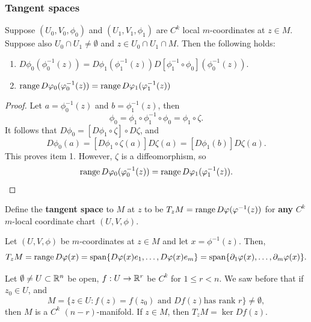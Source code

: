 \documentclass[a4paper]{article}
\begin{document}
\subsubsection{Tangent spaces}

\begin{lemma}
Suppose $(U_0, V_0, \phi_0)$ and $(U_1, V_1, \phi_1)$
are $C^k$ local $m$-coordinates at $z \in M$. Suppose
also $U_0 \cap U_1 \neq \emptyset$ and $z \in U_0 \cap
U_1 \cap M$. Then
the following holds:
\begin{enumerate}
\item $D \phi_0 (\phi_0^{-1}(z)) = D\phi_1 (\phi_1^{-1}(z))
D[\phi_1^{-1} \circ \phi_0] (\phi_0^{-1}(z))$.

\item $\operatorname{range} D \varphi_0 (\varphi_0^{-1}(z)) = \operatorname{range} D\varphi_1
(\varphi_1^{-1}(z))$
\end{enumerate}
\end{lemma}

\begin{proof}
Let $a = \phi_0^{-1}(z)$ and $b = \phi_1^{-1}(z)$, then
\[
\phi_0 = \phi_1 \circ \phi^{-1}_1 \circ \phi_0 = \phi_1 \circ
\zeta.
\]
It follows that $D \phi_0 = [D \phi_1 \circ \zeta] \circ D \zeta$,
and
\[
D \phi_0(a) = [D \phi_1 \circ \zeta(a)] D \zeta(a)
= [D \phi_1 (b)] D \zeta(a).
\]
This proves item 1. However, $\zeta$ is a
diffeomorphism, so
\[
\operatorname{range} D\varphi_0(\varphi_0^{-1} (z)) = \operatorname{range} D\varphi_1 (\varphi_1^{-1}(z)).
\]
\end{proof}

\begin{defi}
Define the \textbf{tangent space} to $M$
at $z$ to be $T_z M = \operatorname{range} D\varphi (\varphi^{-1}(z))$
for \textbf{any} $C^k$ $m$-local coordinate chart
$(U, V, \phi)$.
\end{defi}

\begin{eg}
Let $(U, V, \phi)$ be $m$-coordinates at $z \in M$ and
let $x = \phi^{-1}(z)$. Then,
\[
T_z M = \operatorname{range} D\varphi(x) = \operatorname{span} \{D \varphi(x) e_1, \dots,
D \varphi(x) e_m\} =
\operatorname{span} \{\partial_1 \varphi(x), \dots, \partial_m \varphi(x)\}.
\]
\end{eg}

\begin{thm}
Let $\emptyset \neq U \subset \mathbb{R}^n$ be open, $f : U \to \mathbb{R}^r$
be $C^k$ for $1 \leq r < n$. We saw before that if $z_0 \in U$,
and
\[
M = \{z \in U : \text{$f(z) = f(z_0)$ and $Df(z)$
has rank $r$}\} \neq \emptyset,
\]
then $M$ is a $C^k$ $(n - r)$-manifold. If $z \in M$, then
$T_z M = \ker Df(z)$.
\end{thm}
\end{document}
